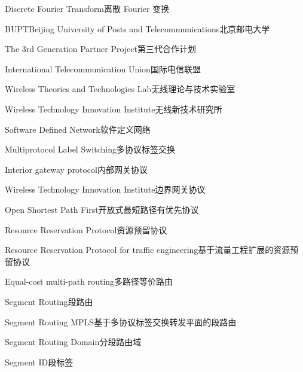 

{Discrete Fourier Transform}{离散 Fourier 变换}

{BUPT}{Beijing University of Posts and Telecommunications}{北京邮电大学}

{The 3rd Generation Partner Project}{第三代合作计划}

{International Telecommunication Union}{国际电信联盟}

{Wireless Theories and Technologies Lab}{无线理论与技术实验室}

{Wireless Technology Innovation Institute}{无线新技术研究所}

{Software Defined Network}{软件定义网络}

{Multiprotocol Label Switching}{多协议标签交换}

{Interior gateway protocol}{内部网关协议}

{Wireless Technology Innovation Institute}{边界网关协议}

{Open Shortest Path First}{开放式最短路径有优先协议}

{Resource Reservation Protocol}{资源预留协议}

{Resource Reservation Protocol for traffic engineering}{基于流量工程扩展的资源预留协议}

{Equal-cost multi-path routing}{多路径等价路由}

{Segment Routing}{段路由}

{Segment Routing MPLS}{基于多协议标签交换转发平面的段路由}

{Segment Routing Domain}{分段路由域}

{Segment ID}{段标签}

